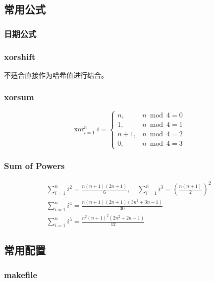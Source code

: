 \newpage

\subsection{常用公式}

\subsubsection{日期公式}


\subsubsection{xorshift}

不适合直接作为哈希值进行结合。


\subsubsection{xorsum}
\[
\operatorname{xor}_{i = 1}^n i = \begin{cases}
n, & n \bmod 4 = 0 \\
1, & n \bmod 4 = 1 \\
n + 1, & n \bmod 4 = 2 \\
0, & n \bmod 4 = 3
\end{cases}
\]


\subsubsection{Sum of Powers}
\[
\begin{gathered}
\sum_{i = 1}^n i^2 = \frac{n(n + 1)(2n + 1)}{6}, \quad \sum_{i = 1}^n i^3 = \left( \frac{n(n + 1)}{2} \right)^2 \\
\sum_{i = 1}^n i^4 = \frac{n(n + 1)(2n + 1)(3n^2 + 3n - 1)}{30} \\
\sum_{i = 1}^n i^5 = \frac{n^2(n + 1)^2(2n^2 + 2n - 1)}{12}
\end{gathered}
\]

\subsection{常用配置}

\subsubsection{makefile}

